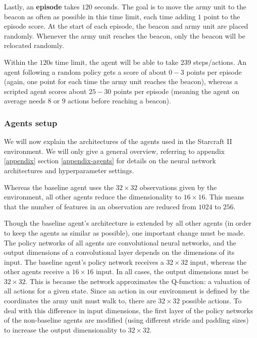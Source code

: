 Lastly, an \textbf{episode} takes $120$ seconds. The goal is to move the army unit to the beacon as often as possible in this time limit, each time adding $1$ point to the episode score. At the start of each episode, the beacon and army unit are placed randomly. Whenever the army unit reaches the beacon, only the beacon will be relocated randomly. 

Within the $120$s time limit, the agent will be able to take 239 steps/actions. An agent following a random policy gets a score of about $0-3$ points per episode (again, one point for each time the army unit reaches the beacon), whereas a scripted agent scores about $25-30$ points per episode (meaning the agent on average needs $8$ or $9$ actions before reaching a beacon).

\subsubsection*{Agents setup}
We will now explain the architectures of the agents used in the Starcraft II environment. We will only give a general overview, referring to appendix \ref{appendix} section \ref{appendix-agents} for details on the neural network architectures and hyperparameter settings. 

Whereas the baseline agent uses the $32 \times 32$ observations given by the environment, all other agents reduce the dimensionality to $16 \times 16$. This means that the number of features in an observation are reduced from $1024$ to $256$.

Though the baseline agent's architecture is extended by all other agents (in order to keep the agents as similar as possible), one important change must be made. The policy networks of all agents are convolutional neural networks, and the output dimensions of a convolutional layer depends on the dimensions of its input. The baseline agent's policy network receives a $32 \times 32$ input, whereas the other agents receive a $16 \times 16$ input. In all cases, the output dimensions must be $32 \times 32$. This is because the network approximates the Q-function: a valuation of all actions for a given state. Since an action in our environment is defined by the coordinates the army unit must walk to, there are $32 \times 32$ possible actions. To deal with this difference in input dimensions, the first layer of the policy networks of the non-baseline agents are modified (using different stride and padding sizes) to increase the output dimensionality to $32 \times 32$.\newline\par

